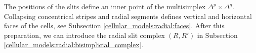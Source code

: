 The positions of the slits define an inner point of the multisimplex $\Delta^p \times \Delta^q$.
Collapsing concentrical stripes and radial segments defines vertical and horizontal faces of the cells,
see Subsection \ref{cellular_models:radial:faces}.
After this preparation, we can introduce the radial slit complex $(R, R')$ in Subsection \ref{cellular_models:radial:bisimplicial_complex}.







